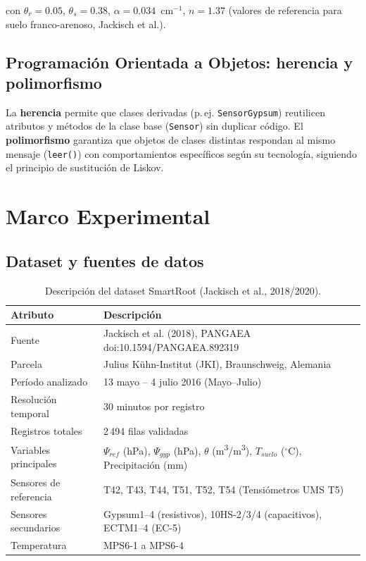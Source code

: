 \documentclass[12pt,a4paper]{article}
\begin{document}
\noindent con $\theta_r = 0.05$, $\theta_s = 0.38$, $\alpha = 0.034$~cm$^{-1}$, $n = 1.37$ (valores de referencia para suelo franco-arenoso, Jackisch et al.).

\subsection{Programación Orientada a Objetos: herencia y polimorfismo}

La \textbf{herencia} permite que clases derivadas (p.\,ej. \texttt{SensorGypsum}) reutilicen atributos y métodos de la clase base (\texttt{Sensor}) sin duplicar código. El \textbf{polimorfismo} garantiza que objetos de clases distintas respondan al mismo mensaje (\texttt{leer()}) con comportamientos específicos según su tecnología, siguiendo el principio de sustitución de Liskov.

\section{Marco Experimental}

\subsection{Dataset y fuentes de datos}

\begin{table}[H]
\centering
\small
\caption{Descripción del dataset SmartRoot (Jackisch et al., 2018/2020).}
\label{tab:dataset}
\begin{tabularx}{\textwidth}{lX}
\toprule
\textbf{Atributo} & \textbf{Descripción} \\
\midrule
Fuente & Jackisch et al. (2018), PANGAEA doi:10.1594/PANGAEA.892319 \\
Parcela & Julius Kühn-Institut (JKI), Braunschweig, Alemania \\
Período analizado & 13 mayo -- 4 julio 2016 (Mayo--Julio) \\
Resolución temporal & 30 minutos por registro \\
Registros totales & 2\,494 filas validadas \\
Variables principales & $\Psi_{ref}$ (hPa), $\Psi_{gyp}$ (hPa), $\theta$ (m\textsuperscript{3}/m\textsuperscript{3}), $T_{suelo}$ ($^\circ$C), Precipitación (mm) \\
Sensores de referencia & T42, T43, T44, T51, T52, T54 (Tensiómetros UMS T5) \\
Sensores secundarios & Gypsum1--4 (resistivos), 10HS-2/3/4 (capacitivos), ECTM1--4 (EC-5) \\
Temperatura & MPS6-1 a MPS6-4 \\
\bottomrule
\end{tabularx}
\end{table}
\end{document}
